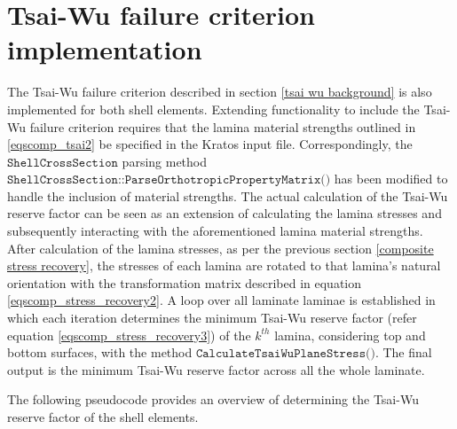 \section{Tsai-Wu failure criterion implementation}
The Tsai-Wu failure criterion described in section \ref{tsai wu background} is also implemented for both shell elements. Extending functionality to include the Tsai-Wu failure criterion requires that the lamina material strengths outlined in \ref{eqscomp_tsai2} be specified in the Kratos input file. Correspondingly, the $\texttt{ShellCrossSection}$ parsing method $\texttt{ShellCrossSection::ParseOrthotropicPropertyMatrix()}$ has been modified to handle the inclusion of material strengths. The actual calculation of the Tsai-Wu reserve factor can be seen as an extension of calculating the lamina stresses and subsequently interacting with the aforementioned lamina material strengths. After calculation of the lamina stresses, as per the previous section \ref{composite stress recovery}, the stresses of each lamina are rotated to that lamina's natural orientation with the transformation matrix described in equation \ref{eqscomp_stress_recovery2}. A loop over all laminate laminae is established in which each iteration determines the minimum Tsai-Wu reserve factor (refer equation \ref{eqscomp_stress_recovery3}) of the $k^{th}$ lamina, considering top and bottom surfaces, with the method $\texttt{CalculateTsaiWuPlaneStress()}$. The final output is the minimum Tsai-Wu reserve factor across all the whole laminate.

The following pseudocode provides an overview of determining the Tsai-Wu reserve factor of the shell elements.


